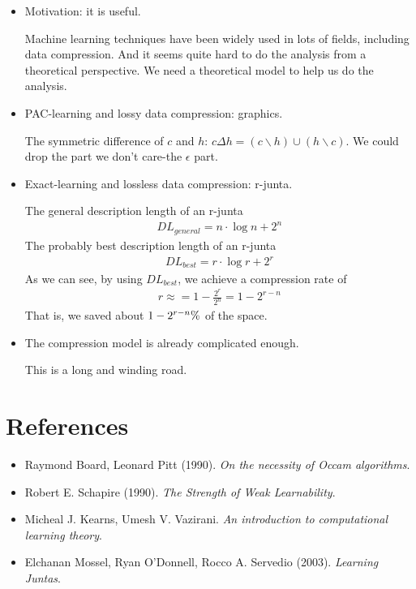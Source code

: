 \documentclass[12pt]{article}
\begin{document}
\begin{itemize}
\item Motivation: it is useful.

  Machine learning techniques have been widely used in lots of fields,
  including data compression. And it seems quite hard to do the
  analysis from a theoretical perspective. We need a theoretical model
  to help us do the analysis.
\item PAC-learning and lossy data compression: graphics.

  The symmetric difference of $c$ and $h$: $c \Delta h = (c \backslash
  h) \cup (h \backslash c)$. We could drop the part we don't care-the
  $\epsilon$ part.
\item Exact-learning and lossless data compression: r-junta.

  The general description length of an r-junta
  \begin{eqnarray*}
    DL_{general} = n \cdot \log n + 2^n
  \end{eqnarray*}
  The probably best description length of an r-junta
  \begin{eqnarray*}
    DL_{best} = r \cdot \log r + 2^r
  \end{eqnarray*}
  As we can see, by using $DL_{best}$, we achieve a compression rate of
  \begin{eqnarray*}
    r \approx = 1 - \frac {2^r}{2^n} = 1 - 2^{r-n}
  \end{eqnarray*}
  That is, we saved about $1 - 2^{r-n} \time 100\%$ of the space.
\item The compression model is already complicated enough.

  This is a long and winding road.
\end{itemize}

\section{References}

\begin{itemize}
\item Raymond Board, Leonard Pitt (1990). \emph {On the necessity of
    Occam algorithms}.
\item Robert E. Schapire (1990). \emph {The Strength of Weak
    Learnability}.
\item Micheal J. Kearns, Umesh V. Vazirani. \emph {An introduction to
    computational learning theory}.
\item Elchanan Mossel, Ryan O'Donnell, Rocco A. Servedio (2003). \emph
  {Learning Juntas}.
\end{itemize}
\end{document}
